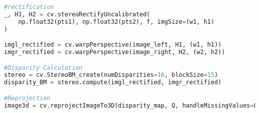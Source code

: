 \begin{lstlisting}[language=python, caption=Uncalibrated Rectification]
#rectification
_, H1, H2 = cv.stereoRectifyUncalibrated(
    np.float32(pts1), np.float32(pts2), f, imgSize=(w1, h1)
)

imgl_rectified = cv.warpPerspective(image_left, H1, (w1, h1))
imgr_rectified = cv.warpPerspective(image_right, H2, (w2, h2))

#Disparity Calculation
stereo = cv.StereoBM_create(numDisparities=16, blockSize=15)
disparity_BM = stereo.compute(imgl_rectified, imgr_rectified)

#Reprojection
image3d = cv.reprojectImageTo3D(disparity_map, Q, handleMissingValues=False)

\end{lstlisting}


